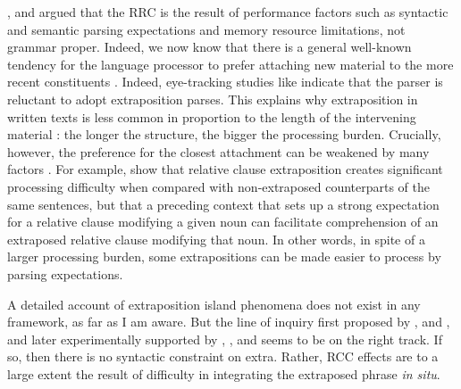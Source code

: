 \documentclass[output=paper
 	        ,biblatex
                ,babelshorthands
                ,newtxmath
                ,draftmode
                ,colorlinks, citecolor=brown
]{langscibook}
\begin{document}
\eal \label{nosubza}





\zl


 \citet{grosurrc},  \citet{gazdar} and \citet{stucky} argued that the RRC is the result of
  performance  factors such as  syntactic and semantic parsing expectations and  memory resource  limitations,  not grammar proper.   Indeed, we now know that  there is a general well-known  tendency for the language processor to  prefer attaching new material
 to the more recent constituents  \citep{frazcl,gibetal,trax98,fodor02b,fernandez03}. 
Indeed, eye-tracking studies like \citet{hnps}  indicate that the
parser is reluctant to adopt  extraposition  parses.
This  explains why     extraposition in written texts
is less common in proportion to the length of  the  intervening material \citep{UBDKKOS98b}:
the longer the structure, the bigger the processing burden. 
 Crucially, however, the preference for the closest attachment can be weakened by
many factors \citep{fernandez03,desmet,devic,carreras}. 
For example,  \citet{levyted}  show that relative clause extraposition creates
 significant processing difficulty when compared with  non-extraposed counterparts of 
 the same sentences,   but that a preceding context that sets up a strong expectation
for a relative clause modifying a given noun can  facilitate
comprehension of an extraposed relative clause modifying that noun.
In other words, in spite of a larger processing burden,
some extrapositions can be made easier to process by parsing expectations.

A detailed account of extraposition island phenomena  does not exist in any framework, as far as I
am aware. But the line of inquiry first proposed by  \citet{grosurrc},  \citet{gazdar} and \citet{stucky},  and later experimentally supported by \citet{levyted}, \citet{SS2009a-u}, and \citet{strunk} seems to be on the right track. If so, then there is no syntactic constraint on {\sc extra}. Rather, RCC effects are to a large extent the result of difficulty in integrating the extraposed phrase \emph{in situ}.  
\end{document}
